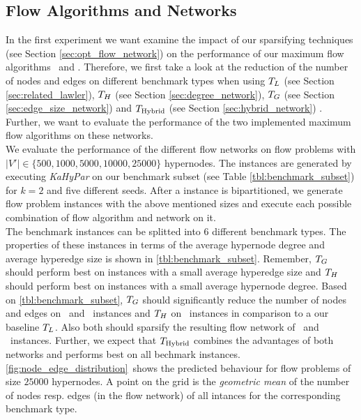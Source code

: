 \subsection{Flow Algorithms and Networks}
\label{sec:exp_flow_network}

In the first experiment we want examine the impact of our sparsifying techniques (see Section \ref{sec:opt_flow_network})
on the performance of our maximum flow algorithms \GoldbergTarjan~and \EdmondKarp. 
Therefore, we first take a look at the reduction of the number of nodes and edges on different benchmark types
when using $T_L$ (see Section \ref{sec:related_lawler}), $T_H$ (see Section 
\ref{sec:degree_network}), $T_G$ (see Section \ref{sec:edge_size_network})
and $T_{\text{Hybrid}}$ (see Section \ref{sec:hybrid_network}) . Further, we
want to evaluate the performance of the two implemented maximum flow algorithms on these
networks. \\
We evaluate the performance of the different flow networks on flow problems with
$|V'| \in \{500,1000,5000,10000,25000\}$ hypernodes. The instances are generated by executing
\emph{KaHyPar} on our benchmark subset (see Table \ref{tbl:benchmark_subset}) for $k = 2$ and five different 
seeds. After a instance is bipartitioned, we generate flow problem instances
with the above mentioned sizes and execute each possible combination of flow algorithm and
network on it. \\
The benchmark instances can be splitted into $6$ different benchmark types. The properties of these instances
in terms of the average hypernode degree and average hyperedge size is shown in \autoref{tbl:benchmark_subset}.
Remember, $T_G$ should perform best on instances with a small average hyperedge size and
$T_H$ should perform best on instances with a small average hypernode degree. Based on 
\autoref{tbl:benchmark_subset}, $T_G$ should significantly reduce the number of
nodes and edges on \Primal~and \Literal~instances and $T_H$ on \Dual~instances in
comparison to a our baseline $T_L$. Also both should sparsify the resulting flow network
of \ISPD~and \DAC~instances. Further, we expect that $T_{\text{Hybrid}}$ combines the advantages of
both networks and performs best on all bechmark instances.\\
\autoref{fig:node_edge_distribution}~shows the predicted behaviour for flow problems of size
$25000$ hypernodes. A point on the grid is the \emph{geometric mean} of the number of 
nodes resp. edges (in the flow network) of all intances for the corresponding benchmark type.
